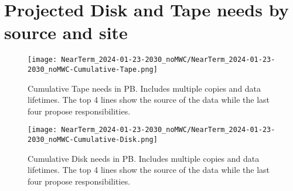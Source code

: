\section{Projected Disk and Tape needs by source and site}
\begin{figure}[h]
\centering\texttt{[image: NearTerm\_2024-01-23-2030\_noMWC/NearTerm\_2024-01-23-2030\_noMWC-Cumulative-Tape.png]}
\caption{Cumulative Tape needs in PB. Includes multiple copies and data lifetimes. The top 4 lines show the source of the data while the last four propose responsibilities.}
\label{fig:Cumulative-Tape}
\end{figure}
\begin{figure}[h]
\centering\texttt{[image: NearTerm\_2024-01-23-2030\_noMWC/NearTerm\_2024-01-23-2030\_noMWC-Cumulative-Disk.png]}
\caption{Cumulative Disk needs in PB. Includes multiple copies and data lifetimes. The top 4 lines show the source of the data while the last four propose responsibilities.}
\label{fig:Cumulative-Disk}
\end{figure}
